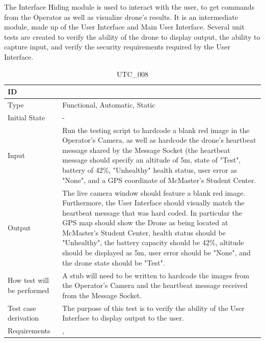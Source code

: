\documentclass[12pt, titlepage]{article}
\begin{document}
The Interface Hiding module is used to interact with the user, to get commands from the Operator as well as visualize drone's results. It is an intermediate module, made up of the User Interface and Main User Interface. Several unit tests are created to verify the ability of the drone to display output, the ability to capture input, and verify the security requirements required by the User Interface. 

\begin{table}[!h]
\begin{center}
\caption {UTC\_008}
\label{tab:UTC_008}
\begin{tabular}{ | m{3.2cm} | m{12.2cm} | } 
\hline
ID & \nameref{tab:UTC_008} \\ 
\hline
Type & Functional, Automatic, Static  \\ 
\hline
Initial State & -\\ 
\hline
Input & Run the testing script to hardcode a blank red image in the Operator's Camera, as well as hardcode the drone's heartbeat message shared by the Message Socket (the heartbeat message should specify an altitude of 5m, state of "Test", battery of 42\%, "Unhealthy" health status, user error as "None", and a GPS coordinate of McMaster's Student Center.  \\ 
\hline
Output & The live camera window should feature a blank red image. Furthermore, the User Interface should visually match the heartbeat message that was hard coded. In particular the GPS map should show the Drone as being located at McMaster's Student Center, health status should be "Unhealthy", the battery capacity should be 42\%, altitude should be displayed as 5m, user error should be "None", and the drone state should be "Test".\\ 
\hline
How test will be performed & A stub will need to be written to hardcode the images from the Operator's Camera and the heartbeat message received from the Message Socket.\\ 
\hline
Test case derivation &  The purpose of this test is to verify the ability of the User Interface to display output to the user.\\ 
\hline
Requirements &  \nameref{USE_005}, \nameref{SR_002}\\ 
\hline
\end{tabular}
\end{center}
\end{table}
\end{document}
